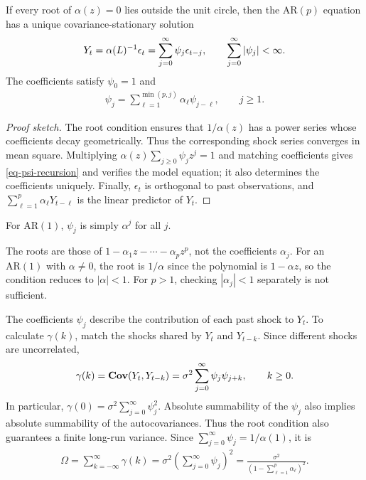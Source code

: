 \documentclass[a4paper,12pt]{article}
\begin{document}
\begin{theorem}\label{thm-ar-stationary}
	If every root of $\alpha(z)=0$ lies outside the unit circle,
	then the $\mathrm{AR}(p)$ equation has a unique covariance-stationary solution
	\begin{align}\label{eq-ar-linear}
		Y_t=\alpha(L)^{-1}\epsilon_t
		=\sum_{j=0}^{\infty}\psi_j\epsilon_{t-j},\qquad
		\sum_{j=0}^{\infty}|\psi_j|<\infty.
	\end{align}
	The coefficients satisfy $\psi_0=1$ and
	\begin{align}\label{eq-psi-recursion}
		\psi_j=\sum_{\ell=1}^{\min(p,j)}\alpha_\ell\psi_{j-\ell},\qquad j\ge1.
	\end{align}
\end{theorem}
\begin{proof}[Proof sketch]
	The root condition ensures that $1/\alpha(z)$ has a power series whose coefficients decay geometrically.
	Thus the corresponding shock series converges in mean square.
	Multiplying $\alpha(z)\sum_{j\ge0}\psi_jz^j=1$ and matching coefficients gives \eqref{eq-psi-recursion}
	and verifies the model equation; it also determines the coefficients uniquely.
	Finally, $\epsilon_t$ is orthogonal to past observations, and
	$\sum_{\ell=1}^p\alpha_\ell Y_{t-\ell}$ is the linear predictor of $Y_t$.
\end{proof}

\begin{remark}
	For $\mathrm{AR}(1)$, $\psi_j$ is simply $\alpha^j$ for all $j$.
\end{remark}

\begin{remark}
	The roots are those of $1-\alpha_1z-\cdots-\alpha_pz^p$, not the coefficients $\alpha_j$.
	For an $\mathrm{AR}(1)$ with $\alpha\neq0$, the root is $1/\alpha$ since the polynomial is $1-\alpha z$,
	so the condition reduces to $|\alpha|<1$.
	For $p>1$, checking $|\alpha_j|<1$ separately is not sufficient.
\end{remark}

\begin{remark}
	The coefficients $\psi_j$ describe the contribution of each past shock to $Y_t$.
	To calculate $\gamma(k)$, match the shocks shared by $Y_t$ and $Y_{t-k}$.
	Since different shocks are uncorrelated,
	\begin{align*}
		\gamma(k)=\operatorname{\text{\textrm{\upshape\textbf{Cov}}}}(Y_t,Y_{t-k})
		=\sigma^2\sum_{j=0}^{\infty}\psi_j\psi_{j+k},\qquad k\ge0.
	\end{align*}
	In particular, $\gamma(0)=\sigma^2\sum_{j=0}^{\infty}\psi_j^2$.
	Absolute summability of the $\psi_j$ also implies absolute summability of the autocovariances.
	Thus the root condition also guarantees a finite long-run variance.
	Since $\sum_{j=0}^{\infty}\psi_j=1/\alpha(1)$, it is
	\begin{align*}
		\Omega=\sum_{k=-\infty}^{\infty}\gamma(k)
		=\sigma^2\left(\sum_{j=0}^{\infty}\psi_j\right)^2
		=\frac{\sigma^2}{\left(1-\sum_{\ell=1}^{p}\alpha_\ell\right)^2}.
	\end{align*}
\end{remark}
\end{document}
